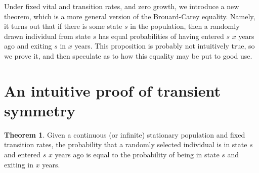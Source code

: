 \documentclass[12pt,oneside,a4paper]{article} %
\theoremstyle{definition}
\newtheorem{theorem}{Theorem}[section]
\begin{document}
Under fixed vital and transition rates, and zero growth, we introduce a new
theorem, which is a more general version of the Brouard-Carey equality.
Namely, it turns out that if there is some state $s$ in the population, then a
randomly drawn individual from state $s$ has equal probabilities of having
entered $s$ $x$ years ago and exiting $s$ in $x$ years. This proposition
is probably not intuitively true, so we prove it, and then speculate as to how this
equality may be put to good use.

\section{An intuitive proof of transient symmetry}
\FloatBarrier

\begin{theorem}
Given a continuous (or infinite) stationary population and fixed transition
rates, the probability that a randomly selected individual is in state $s$ and entered $s$ $x$ years
ago is equal to the probability of being in state $s$ and exiting in $x$ years.
\end{theorem}
\end{document}
